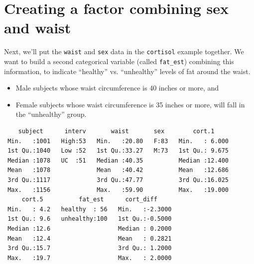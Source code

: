 \documentclass[]{book}
\newenvironment{Shaded}{\begin{snugshade}}{\end{snugshade}}
\newcommand{\KeywordTok}[1]{\textcolor[rgb]{0.13,0.29,0.53}{\textbf{#1}}}
\newcommand{\DataTypeTok}[1]{\textcolor[rgb]{0.13,0.29,0.53}{#1}}
\newcommand{\DecValTok}[1]{\textcolor[rgb]{0.00,0.00,0.81}{#1}}
\newcommand{\StringTok}[1]{\textcolor[rgb]{0.31,0.60,0.02}{#1}}
\newcommand{\OtherTok}[1]{\textcolor[rgb]{0.56,0.35,0.01}{#1}}
\newcommand{\OperatorTok}[1]{\textcolor[rgb]{0.81,0.36,0.00}{\textbf{#1}}}
\newcommand{\NormalTok}[1]{#1}
\providecommand{\tightlist}{%
  \setlength{\itemsep}{0pt}\setlength{\parskip}{0pt}}
\theoremstyle{definition}
\theoremstyle{definition}
\theoremstyle{definition}
\theoremstyle{remark}
\begin{document}
\section{Creating a factor combining sex and
waist}\label{creating-a-factor-combining-sex-and-waist}

Next, we'll put the \texttt{waist} and \texttt{sex} data in the
\texttt{cortisol} example together. We want to build a second
categorical variable (called \texttt{fat\_est}) combining this
information, to indicate ``healthy'' vs. ``unhealthy'' levels of fat
around the waist.

\begin{itemize}
\tightlist
\item
  Male subjects whose waist circumference is 40 inches or more, and
\item
  Female subjects whose waist circumference is 35 inches or more, will
  fall in the ``unhealthy'' group.
\end{itemize}

\begin{Shaded}
\end{Shaded}

\begin{verbatim}
    subject      interv       waist       sex        cort.1      
 Min.   :1001   High:53   Min.   :20.80   F:83   Min.   : 6.000  
 1st Qu.:1040   Low :52   1st Qu.:33.27   M:73   1st Qu.: 9.675  
 Median :1078   UC  :51   Median :40.35          Median :12.400  
 Mean   :1078             Mean   :40.42          Mean   :12.686  
 3rd Qu.:1117             3rd Qu.:47.77          3rd Qu.:16.025  
 Max.   :1156             Max.   :59.90          Max.   :19.000  
     cort.5          fat_est      cort_diff      
 Min.   : 4.2   healthy  : 56   Min.   :-2.3000  
 1st Qu.: 9.6   unhealthy:100   1st Qu.:-0.5000  
 Median :12.6                   Median : 0.2000  
 Mean   :12.4                   Mean   : 0.2821  
 3rd Qu.:15.7                   3rd Qu.: 1.2000  
 Max.   :19.7                   Max.   : 2.0000  
\end{verbatim}
\end{document}
